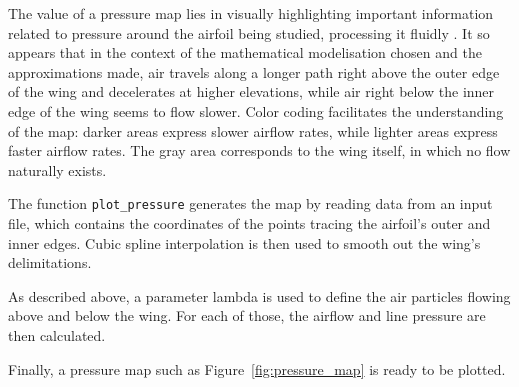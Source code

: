 The value of a pressure map lies in visually highlighting important information related to pressure around the airfoil being studied, processing it fluidly . It so appears that in the context of the mathematical modelisation chosen and the approximations made, air travels along a longer path right above the outer edge of the wing and decelerates at higher elevations, while air right below the inner edge of the wing seems to flow slower. Color coding facilitates the understanding of the map: darker areas express slower airflow rates, while lighter areas express faster airflow rates. The gray area corresponds to the wing itself, in which no flow naturally exists.

The function \verb|plot_pressure| generates the map by reading data from an input file, which contains the coordinates of the points tracing the airfoil's outer and inner edges. Cubic spline interpolation is then used to smooth out the wing's delimitations.

As described above, a parameter lambda is used to define the air particles flowing above and below the wing. For each of those, the airflow and line pressure are then calculated.

Finally, a pressure map such as Figure~\ref{fig:pressure_map} is ready to be plotted.
